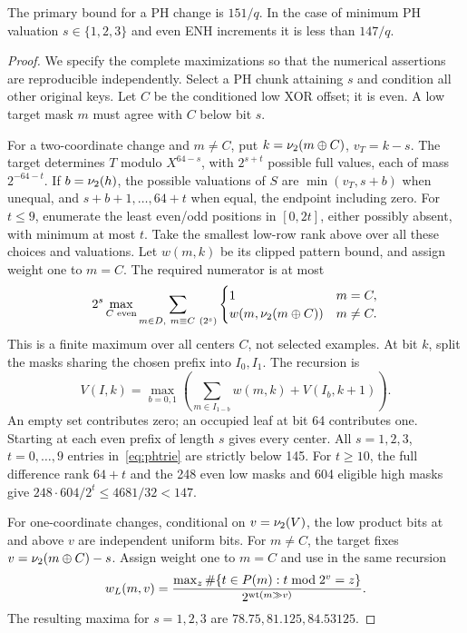 \begin{lemma}\label{lem:ph151}
The primary bound for a PH change is $151/q$. In the case of minimum PH valuation $s\in\{1,2,3\}$ and even ENH increments it is less than $147/q$.
\end{lemma}
\begin{proof}
We specify the complete maximizations so that the numerical assertions are reproducible independently. Select a PH chunk attaining $s$ and condition all other original keys. Let $C$ be the conditioned low XOR offset; it is even. A low target mask $m$ must agree with $C$ below bit $s$.

For a two-coordinate change and $m\ne C$, put $k=\nu_2(m\mathbin\oplus C)$, $v_T=k-s$. The target determines $T$ modulo $X^{64-s}$, with $2^{s+t}$ possible full values, each of mass $2^{-64-t}$. If $b=\nu_2(h)$, the possible valuations of $S$ are $\min(v_T,s+b)$ when unequal, and $s+b+1,\ldots,64+t$ when equal, the endpoint including zero. For $t\le9$, enumerate the least even/odd positions in $[0,2t]$, either possibly absent, with minimum at most $t$. Take the smallest low-row rank above over all these choices and valuations. Let $w(m,k)$ be its clipped pattern bound, and assign weight one to $m=C$. The required numerator is at most
\begin{equation}\label{eq:phtrie}
 2^s\max_{C\text{ even}}\sum_{m\in D,\ m\equiv C\ (2^s)}
 \begin{cases}1&m=C,\\w(m,\nu_2(m\mathbin\oplus C))&m\ne C.\end{cases}
\end{equation}
This is a finite maximum over all centers $C$, not selected examples. At bit $k$, split the masks sharing the chosen prefix into $I_0,I_1$. The recursion is
\[
 V(I,k)=\max_{b=0,1}\left(\sum_{m\in I_{1-b}}w(m,k)+V(I_b,k+1)\right).
\]
An empty set contributes zero; an occupied leaf at bit 64 contributes one. Starting at each even prefix of length $s$ gives every center. All $s=1,2,3$, $t=0,\ldots,9$ entries in~\eqref{eq:phtrie} are strictly below 145. For $t\ge10$, the full difference rank $64+t$ and the 248 even low masks and 604 eligible high masks give $248\cdot604/2^t\le4681/32<147$.

For one-coordinate changes, conditional on $v=\nu_2(V)$, the low product bits at and above $v$ are independent uniform bits. For $m\ne C$, the target fixes $v=\nu_2(m\mathbin\oplus C)-s$. Assign weight one to $m=C$ and use in the same recursion
\begin{equation}\label{eq:wlow}
 w_L(m,v)=\frac{\max_z\#\{t\in P(m):t\bmod2^v=z\}}
 {2^{\operatorname{wt}(m\mathbin{\gg}v)}}.
\end{equation}
The resulting maxima for $s=1,2,3$ are $78.75,81.125,84.53125$.


\end{proof}
